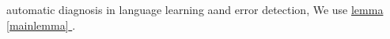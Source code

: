 \documentclass[10pt,a4paper]{article}
\begin{document}
automatic diagnosis\label{mainlemma} in language learning aand error detection, We use \hyperref[mainlemma]{lemma \ref*{mainlemma} }. 
\end{document}

